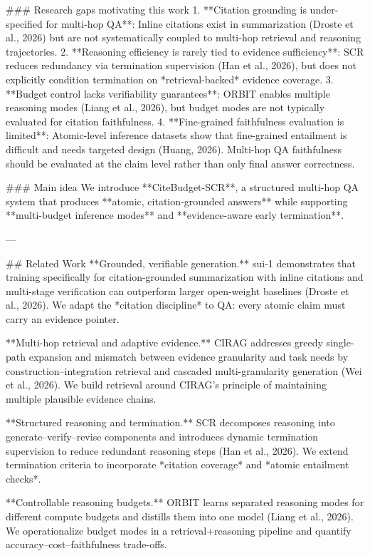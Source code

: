 ### Research gaps motivating this work  
1. **Citation grounding is under-specified for multi-hop QA**: Inline citations exist in summarization (Droste et al., 2026) but are not systematically coupled to multi-hop retrieval and reasoning trajectories.  
2. **Reasoning efficiency is rarely tied to evidence sufficiency**: SCR reduces redundancy via termination supervision (Han et al., 2026), but does not explicitly condition termination on *retrieval-backed* evidence coverage.  
3. **Budget control lacks verifiability guarantees**: ORBIT enables multiple reasoning modes (Liang et al., 2026), but budget modes are not typically evaluated for citation faithfulness.  
4. **Fine-grained faithfulness evaluation is limited**: Atomic-level inference datasets show that fine-grained entailment is difficult and needs targeted design (Huang, 2026). Multi-hop QA faithfulness should be evaluated at the claim level rather than only final answer correctness.  

### Main idea  
We introduce **CiteBudget-SCR**, a structured multi-hop QA system that produces **atomic, citation-grounded answers** while supporting **multi-budget inference modes** and **evidence-aware early termination**.

---

## Related Work  
**Grounded, verifiable generation.** sui-1 demonstrates that training specifically for citation-grounded summarization with inline citations and multi-stage verification can outperform larger open-weight baselines (Droste et al., 2026). We adapt the *citation discipline* to QA: every atomic claim must carry an evidence pointer.  

**Multi-hop retrieval and adaptive evidence.** CIRAG addresses greedy single-path expansion and mismatch between evidence granularity and task needs by construction–integration retrieval and cascaded multi-granularity generation (Wei et al., 2026). We build retrieval around CIRAG’s principle of maintaining multiple plausible evidence chains.  

**Structured reasoning and termination.** SCR decomposes reasoning into generate–verify–revise components and introduces dynamic termination supervision to reduce redundant reasoning steps (Han et al., 2026). We extend termination criteria to incorporate *citation coverage* and *atomic entailment checks*.  

**Controllable reasoning budgets.** ORBIT learns separated reasoning modes for different compute budgets and distills them into one model (Liang et al., 2026). We operationalize budget modes in a retrieval+reasoning pipeline and quantify accuracy–cost–faithfulness trade-offs.  

